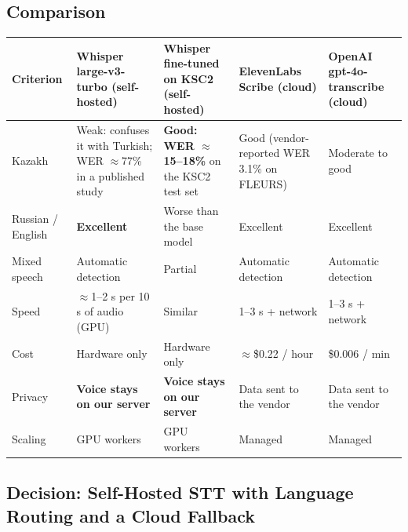 \documentclass[11pt,a4paper]{article}
\newcommand{\tblstart}{\small\rowcolors{2}{gray!7}{white}}
\begin{document}
\subsection{Comparison}

{\tblstart
\begin{xltabular}{\textwidth}{P{2.7cm} L L L L}
\toprule
\textbf{Criterion} & \textbf{Whisper large-v3-turbo (self-hosted)} & \textbf{Whisper fine-tuned on KSC2 (self-hosted)} & \textbf{ElevenLabs Scribe (cloud)} & \textbf{OpenAI gpt-4o-transcribe (cloud)} \\
\midrule
\endhead
Kazakh & Weak: confuses it with Turkish; WER $\approx$77\% in a published study & \textbf{Good: WER $\approx$15--18\%} on the KSC2 test set & Good (vendor-reported WER 3.1\% on FLEURS) & Moderate to good \\
Russian / English & \textbf{Excellent} & Worse than the base model & Excellent & Excellent \\
Mixed speech & Automatic detection & Partial & Automatic detection & Automatic detection \\
Speed & $\approx$1--2 s per 10 s of audio (GPU) & Similar & 1--3 s + network & 1--3 s + network \\
Cost & Hardware only & Hardware only & $\approx$\$0.22 / hour & \$0.006 / min \\
Privacy & \textbf{Voice stays on our server} & \textbf{Voice stays on our server} & Data sent to the vendor & Data sent to the vendor \\
Scaling & GPU workers & GPU workers & Managed & Managed \\
\bottomrule
\end{xltabular}}

\subsection{Decision: Self-Hosted STT with Language Routing and a Cloud Fallback}
\end{document}

